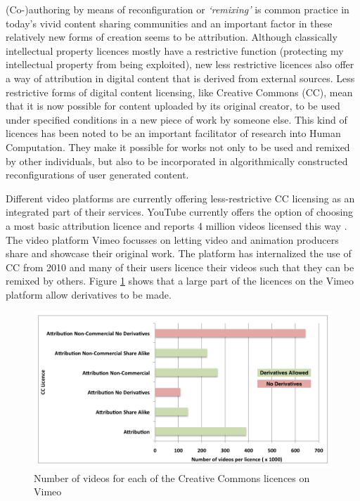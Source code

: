 (Co-)authoring by means of reconfiguration or \emph{`remixing'} is common practice in today's vivid content sharing communities \cite{Diakopoulos:2007jn} and an important factor in these relatively new forms of creation seems to be attribution\cite{Luther:2010wq}. Although classically intellectual property licences mostly have a restrictive function (protecting my intellectual property from being exploited), new less restrictive licences also offer a way of attribution in digital content that is derived from external sources. Less restrictive forms of digital content licensing, like Creative Commons (CC), mean that it is now possible for content uploaded by its original creator, to be used under specified conditions in a new piece of work by someone else. This kind of licences has been noted to be an important facilitator of research into Human Computation\cite{Law:2009vl}. They make it possible for works not only to be used and remixed by other individuals, but also to be incorporated in algorithmically constructed reconfigurations of user generated content.

Different video platforms are currently offering less-restrictive CC licensing as an integrated part of their services. YouTube currently offers the option of choosing a most basic attribution licence and reports 4 million videos licensed this way \cite{YouTubeCC}. The video platform Vimeo focusses on letting video and animation producers share and showcase their original work. The platform has internalized the use of CC from 2010\cite{vimeoTimeline} and many of their users licence their videos such that they can be remixed by others. Figure \ref{fig:vimeoCC} shows that a large part of the licences on the Vimeo platform allow derivatives to be made\cite{vimeoCC}.

\begin{figure}[htbp]
  \centering
    \includegraphics[scale=1]{img/vimeoCC}
  \caption{Number of videos for each of the Creative Commons licences on Vimeo}
  \label{fig:vimeoCC}
\end{figure}

